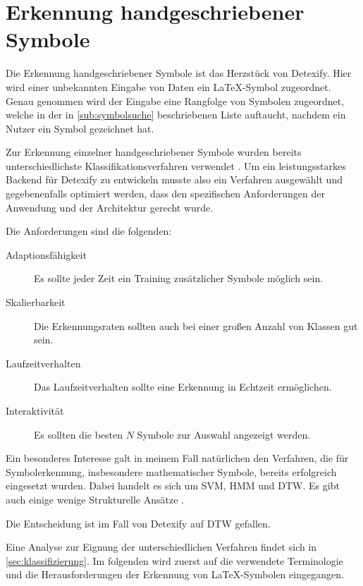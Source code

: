 \chapter{Erkennung handgeschriebener Symbole} %
\label{cha:erkennung_handgeschriebener_symbole}

Die Erkennung handgeschriebener Symbole ist das Herzstück von Detexify. Hier wird einer unbekannten Eingabe von Daten ein \LaTeX-Symbol zugeordnet. Genau genommen wird der Eingabe eine Rangfolge von Symbolen zugeordnet, welche in der in \ref{sub:symbolsuche} beschriebenen Liste auftaucht, nachdem ein Nutzer ein Symbol gezeichnet hat.

Zur Erkennung einzelner handgeschriebener Symbole wurden bereits unterschiedlichste Klassifikationsverfahren verwendet \cite{Plamondon:2000p10303}. Um ein leistungsstarkes Backend für Detexify zu entwickeln musste also ein Verfahren ausgewählt und gegebenenfalls optimiert werden, dass den spezifischen Anforderungen der Anwendung und der Architektur gerecht wurde.

Die Anforderungen sind die folgenden:

\begin{description}
  \item[Adaptionsfähigkeit] Es sollte jeder Zeit ein Training zusätzlicher Symbole möglich sein.
  \item[Skalierbarkeit] Die Erkennungsraten sollten auch bei einer großen Anzahl von Klassen gut sein.
  \item[Laufzeitverhalten] Das Laufzeitverhalten sollte eine Erkennung in Echtzeit ermöglichen.
  \item[Interaktivität] Es sollten die besten $N$ Symbole zur Auswahl angezeigt werden. 
\end{description}

Ein besonderes Interesse galt in meinem Fall natürlichen den Verfahren, die für Symbolerkennung, insbesondere mathematischer Symbole, bereits erfolgreich eingesetzt wurden. Dabei handelt es sich um \ac{SVM}, \ac{HMM} und \ac{DTW}. Es gibt auch einige wenige Strukturelle Ansätze \cite{Genoe:2006p10601}.

Die Entscheidung ist im Fall von Detexify auf \ac{DTW} gefallen.

Eine Analyse zur Eignung der unterschiedlichen Verfahren findet sich in \ref{sec:klassifizierung}. Im folgenden wird zuerst auf die verwendete Terminologie und die Herausforderungen der Erkennung von \LaTeX-Symbolen eingegangen.


